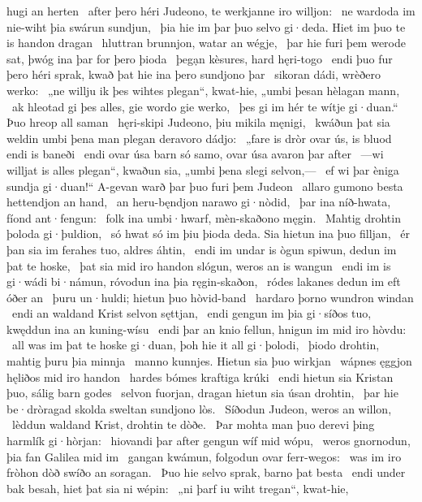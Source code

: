 hugi an herten \hld\ after þero héri Judeono,
te werkjanne iro willjon: \hld\ ne wardoda im nie-wiht
þia swárun sundjun, \hld\ þia hie im þar þuo selvo gi·deda.
Hiet im þuo te is handon dragan \hld\ hluttran brunnjon,
watar an wégje, \hld\ þar hie furi þem werode sat,
þwóg ina þar for þero þioda \hld\ þegạn kèsures,
hard hęri-togo \hld\ endi þuo fur þero héri sprak,
kwað þat hie ina þero sundjono þar \hld\ sikoran dádi,
wrèðero werko: \hld\ „ne willju ik þes wihtes plegan“, kwat-hie,
„umbi þesan hèlagan mann, \hld\ ak hleotad gi þes alles,
gie wordo gie werko, \hld\ þes gi im hér te wítje gi·duan.“
Þuo hreop all saman \hld\ hęri-skipi Judeono,
þiu mikila męnigi, \hld\ kwáðun þat sia weldin umbi þena man plegan
deravoro dádjo: \hld\ „fare is dròr ovar ús,
is bluod endi is baneði \hld\ endi ovar úsa barn só samo,
ovar úsa avaron þar after \hld\ —wi willjat is alles plegan“, kwaðun sia,
„umbi þena slegi selvon,— \hld\ ef wi þar èniga sundja gi·duan!“
A-gevan warð þar þuo furi þem Judeon \hld\ allaro gumono besta
hettendjon an hand, \hld\ an heru-bęndjon
narawo gi·nòdid, \hld\ þar ina níð-hwata,
fíond ant·fengun: \hld\ folk ina umbi·hwarf,
mèn-skaðono męgin. \hld\ Mahtig drohtin
þoloda gi·þuldion, \hld\ só hwat só im þiu þioda deda.
Sia hietun ina þuo filljan, \hld\ ér þan sia im ferahes tuo,
aldres áhtin, \hld\ endi im undar is ògun spiwun,
dedun im þat te hoske, \hld\ þat sia mid iro handon slógun,
weros an is wangun \hld\ endi im is gi·wádi bi·námun,
róvodun ina þia ręgin-skaðon, \hld\ ródes lakanes
dedun im eft óðer an \hld\ þuru un·huldi;
hietun þuo hòvid-band \hld\ hardaro þorno
wundron windan \hld\ endi an waldand Krist
selvon sęttjan, \hld\ endi gengun im þia gi·síðos tuo,
kwęddun ina an kuning-wísu \hld\ endi þar an knio fellun,
hnigun im mid iro hòvdu: \hld\ all was im þat te hoske gi·duan,
þoh hie it all gi·þolodi, \hld\ þiodo drohtin,
mahtig þuru þia minnja \hld\ manno kunnjes.
Hietun sia þuo wirkjan \hld\ wápnes ęggjon
hęliðos mid iro handon \hld\ hardes bómes
kraftiga krúki \hld\ endi hietun sia Kristan þuo,
sálig barn godes \hld\ selvon fuorjan,
dragan hietun sia úsan drohtin, \hld\ þar hie be·dròragad skolda
sweltan sundjono lòs. \hld\ Síðodun Judeon,
weros an willon, \hld\ lèddun waldand Krist,
drohtin te dòðe. \hld\ Þar mohta man þuo derevi þing
harmlík gi·hòrjan: \hld\ hiovandi þar after
gengun wíf mid wópu, \hld\ weros gnornodun,
þia fan Galilea mid im \hld\ gangan kwámun,
folgodun ovar ferr-wegos: \hld\ was im iro fròhon dòð
swíðo an soragan. \hld\ Þuo hie selvo sprak,
barno þat besta \hld\ endi under bak besah,
hiet þat sia ni wépin: \hld\ „ni þarf iu wiht tregan“, kwat-hie,
